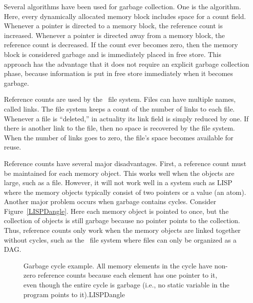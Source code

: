 Several algorithms have been used for garbage collection.
One is the  algorithm.
Here, every dynamically allocated memory block includes space for a
count field.
Whenever a pointer is directed to a memory block, the reference count
is increased.
Whenever a pointer is directed away from a memory block, the reference
count is decreased.
If the count ever becomes zero, then the memory block is considered
garbage and is immediately placed in free store.
This approach has the advantage that it does not require an explicit
garbage collection phase, because information is put in free store
immediately when it becomes garbage.

Reference counts are used by the \UNIX\ file
system.
Files can have multiple names, called links.
The file system keeps a count of the number of links to each file.
Whenever a file is ``deleted,'' in actuality its link field is
simply reduced by one.
If there is another link to the file, then no space is
recovered by the file system.
When the number of links goes to zero, the file's space becomes
available for reuse.

Reference counts have several major disadvantages.
First, a reference count must be maintained for each memory object.
This works well when the objects are large, such as a file.
However, it will not work well in a system such as LISP where the
memory objects typically consist of two pointers or a value (an atom).
Another major problem occurs when garbage contains cycles.
Consider Figure~\ref{LISPDangle}.
Here each memory object is pointed to once, but the collection of
objects is still garbage because no pointer points to the collection.
Thus, reference counts only work when the memory objects are linked
together without cycles,
such as the \UNIX\ file system where files can only be organized
as a DAG.

\begin{figure}
\vspace{-\bigskipamount}\vspace{-\smallskipamount}

{Garbage cycle example.
All memory elements in the cycle have non-zero reference counts because
each element has one pointer to it, even
though the entire cycle is garbage
(i.e., no static variable in the program points to it).}{LISPDangle}
\medskip
\end{figure}


